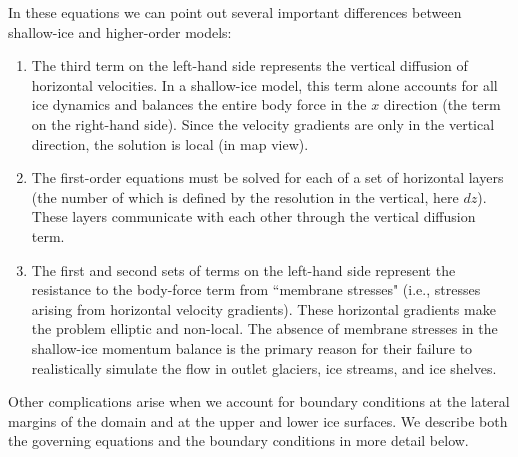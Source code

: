 In these equations we can point out several important differences between shallow-ice and higher-order models: 
\begin{enumerate}
\item  The third term on the left-hand side represents the vertical diffusion of horizontal velocities. In a shallow-ice model, this term alone accounts for all ice dynamics and balances the entire body force in the $x$ direction (the term on the right-hand side). Since the velocity gradients are only in the vertical direction, the solution is local (in map view).

\item  The first-order equations must be solved for each of a set of horizontal layers (the number of which is defined by the resolution in the vertical, here $dz$). These layers communicate with each other through the vertical diffusion term.

\item  The first and second sets of terms on the left-hand side represent the resistance to the body-force term from ``membrane stresses" (i.e., stresses arising from horizontal velocity gradients). These horizontal gradients make the problem elliptic and non-local. The absence of membrane stresses in the shallow-ice momentum balance is the primary reason for their failure to realistically simulate the flow in outlet glaciers, ice streams, and ice shelves.

\end{enumerate}

Other complications arise when we account for boundary conditions at the lateral margins of the domain and at the upper and lower ice surfaces. We describe both the governing equations and the boundary conditions in more detail below.


